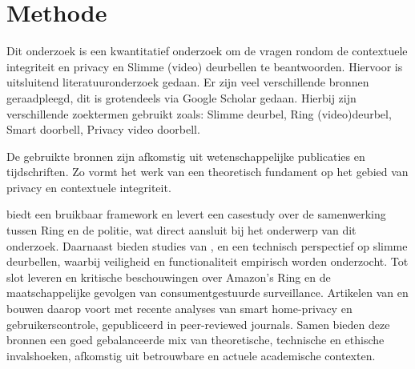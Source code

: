 \documentclass[nonacm, sigconf]{acmart}
\begin{document}
    \section{Methode}
    Dit onderzoek is een kwantitatief onderzoek om de vragen rondom de contextuele integriteit en privacy en Slimme (video) deurbellen te beantwoorden.
    Hiervoor is uitsluitend literatuuronderzoek gedaan.
    Er zijn veel verschillende bronnen geraadpleegd, dit is grotendeels via Google Scholar gedaan.
    Hierbij zijn verschillende zoektermen gebruikt zoals: Slimme deurbel, Ring (video)deurbel, Smart doorbell, Privacy video doorbell.

    De gebruikte bronnen zijn afkomstig uit wetenschappelijke publicaties en tijdschriften.
    Zo vormt het werk van \citeauthor{nissenbaum2009privacy} een theoretisch fundament op het gebied van privacy en contextuele integriteit.

    \citeauthor{van2016privacy} biedt een bruikbaar framework en \citeauthor{shaffer2021applying} levert een casestudy over de samenwerking tussen Ring en de politie, wat direct aansluit bij het onderwerp van dit onderzoek.
    Daarnaast bieden studies van \citeauthor{liu2021ethical}, \citeauthor{lalitha2019smart} en \citeauthor{chaudhari2020smart} een technisch perspectief op slimme deurbellen, waarbij veiligheid en functionaliteit empirisch worden onderzocht.
    Tot slot leveren \citeauthor{selinger2022amazon} en \citeauthor{kelly2023ring} kritische beschouwingen over Amazon's Ring en de maatschappelijke gevolgen van consumentgestuurde surveillance.
    Artikelen van \citeauthor{shaffer2021applying} en \citeauthor{tabassum2023exploring} bouwen daarop voort met recente analyses van smart home-privacy en gebruikerscontrole, gepubliceerd in peer-reviewed journals.
    Samen bieden deze bronnen een goed gebalanceerde mix van theoretische, technische en ethische invalshoeken, afkomstig uit betrouwbare en actuele academische contexten.
\end{document}
